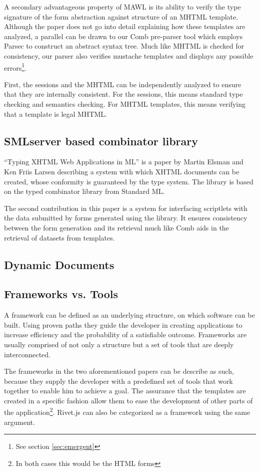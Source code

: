 \documentclass[thesis.tex]{subfiles}
\begin{document}
A secondary advantageous property of MAWL is its ability to verify the
type signature of the form abstraction against structure of an MHTML template.
Although the paper does not go into detail explaining how these templates are
analyzed, a parallel can be drawn to our Comb pre-parser tool which employs
Parsec to construct an abstract syntax tree. Much like MHTML is checked for
consistency, our parser also verifies mustache templates and displays any
possible errors\footnote{See section \ref{sec:emergent}}.
\begin{citequote}{\cite{MAWL}}
First, the sessions and the MHTML can be independently analyzed to ensure that
they are internally consistent.
For the sessions, this means standard type checking and semantics checking.
For MHTML templates, this means verifying that a template is legal MHTML.
\end{citequote}

\subsection{SMLserver based combinator library}
``Typing XHTML Web Applications in ML''\cite{ML} is a paper by Martin Elsman and
Ken Friis Larsen describing a system with which XHTML documents can be created,
whose conformity is guaranteed by the type system. The library is based on the
typed combinator library from Standard ML.

The second contribution in this paper is a system for interfacing scriptlets
with the data submitted by forms generated using the library.
It ensures consistency between the form generation and its retrieval much like
Comb aids in the retrieval of datasets from templates.

\subsection{Dynamic Documents}

\subsection{Frameworks vs. Tools}
A framework can be defined as an underlying structure, on which software can be
built. Using proven paths they guide the developer in creating applications to
increase efficiency and the probability of a satisfiable outcome.
Frameworks are usually comprised of not only a structure but a set of tools that
are deeply interconnected.

The frameworks in the two aforementioned papers can be describe as such, because
they supply the developer with a predefined set of tools that work together to
enable him to achieve a goal. The assurance that the templates are created in a
specific fashion allow them to ease the development of other parts of the
application\footnote{In both cases this would be the HTML forms}. Rivet.js can
also be categorized as a framework using the same argument.
\end{document}
